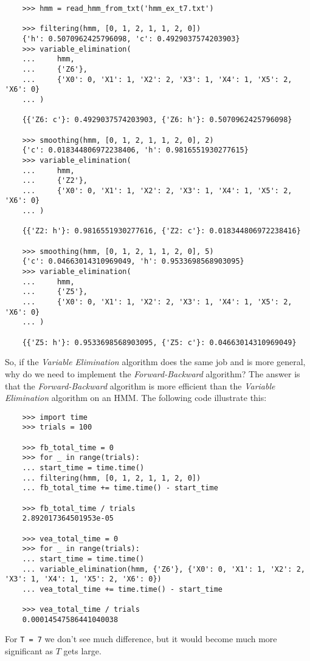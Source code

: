 \documentclass{article}
\theoremstyle{definition}
\begin{document}
\begin{verbatim}
    >>> hmm = read_hmm_from_txt('hmm_ex_t7.txt')

    >>> filtering(hmm, [0, 1, 2, 1, 1, 2, 0])
    {'h': 0.5070962425796098, 'c': 0.4929037574203903}
    >>> variable_elimination(
    ...     hmm,
    ...     {'Z6'},
    ...     {'X0': 0, 'X1': 1, 'X2': 2, 'X3': 1, 'X4': 1, 'X5': 2, 'X6': 0}
    ... )

    {{'Z6: c'}: 0.4929037574203903, {'Z6: h'}: 0.5070962425796098}

    >>> smoothing(hmm, [0, 1, 2, 1, 1, 2, 0], 2)
    {'c': 0.018344806972238406, 'h': 0.9816551930277615}
    >>> variable_elimination(
    ...     hmm,
    ...     {'Z2'},
    ...     {'X0': 0, 'X1': 1, 'X2': 2, 'X3': 1, 'X4': 1, 'X5': 2, 'X6': 0}
    ... )

    {{'Z2: h'}: 0.9816551930277616, {'Z2: c'}: 0.018344806972238416}

    >>> smoothing(hmm, [0, 1, 2, 1, 1, 2, 0], 5)
    {'c': 0.04663014310969049, 'h': 0.9533698568903095}
    >>> variable_elimination(
    ...     hmm,
    ...     {'Z5'},
    ...     {'X0': 0, 'X1': 1, 'X2': 2, 'X3': 1, 'X4': 1, 'X5': 2, 'X6': 0}
    ... )

    {{'Z5: h'}: 0.9533698568903095, {'Z5: c'}: 0.04663014310969049}
\end{verbatim}

So, if the \textit{Variable Elimination} algorithm does the same job and is more general, why do we need to implement the \textit{Forward-Backward} algorithm? The answer is that the \textit{Forward-Backward} algorithm is more efficient than the \textit{Variable Elimination} algorithm on an HMM. The following code illustrate this:

\begin{verbatim}
    >>> import time
    >>> trials = 100

    >>> fb_total_time = 0
    >>> for _ in range(trials):
    ... start_time = time.time()
    ... filtering(hmm, [0, 1, 2, 1, 1, 2, 0])
    ... fb_total_time += time.time() - start_time

    >>> fb_total_time / trials
    2.892017364501953e-05

    >>> vea_total_time = 0
    >>> for _ in range(trials):
    ... start_time = time.time()
    ... variable_elimination(hmm, {'Z6'}, {'X0': 0, 'X1': 1, 'X2': 2, 'X3': 1, 'X4': 1, 'X5': 2, 'X6': 0})
    ... vea_total_time += time.time() - start_time

    >>> vea_total_time / trials
    0.00014547586441040038
\end{verbatim}

For \texttt{T = 7} we don't see much difference, but it would become much more significant as \(T\) gets large.
\end{document}
